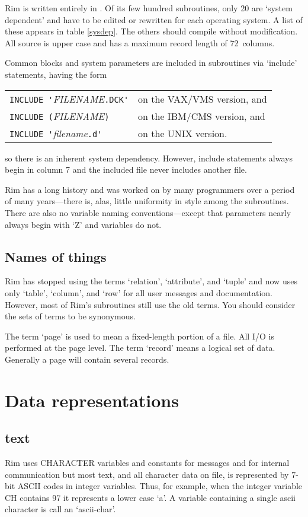 \documentclass[11pt,a4paper]{report}
\begin{document}
Rim is written entirely in \FortranF.  Of its few
hundred subroutines, only 20 are `system dependent'
and have to be edited or rewritten for each operating system.
A list of these appears in table \ref{sysdep}.
The others should compile without modification.
All source is upper case and has a maximum record length of
72~columns.
 
Common blocks and system parameters are included in subroutines
via `include' statements, having the form

\begin{tabular}{ll}
  \verb|INCLUDE '|\emph{FILENAME}\verb|.DCK'| & on the VAX/VMS version, and\\
  \verb|INCLUDE (|\emph{FILENAME}\verb|)| & on the IBM/CMS version, and\\
  \verb|INCLUDE '|\emph{filename}\verb|.d'| & on the UNIX version.
\end{tabular}

so there is an inherent system dependency.  However, include
statements always begin in column 7 and the included file
never includes another file.
 
Rim has a long history and was worked on by many programmers
over a period of many years---there is, alas, little
uniformity in style among the subroutines.  There are also
no variable naming conventions---except that parameters
nearly always begin with `Z' and variables do not.
 
\subsection{Names of things}
%
Rim has stopped using the terms `relation', `attribute', and `tuple'
and now uses only `table', `column', and `row' for all user
messages and documentation.  However, most of Rim's subroutines
still use the old terms.  You should consider the sets of
terms to be synonymous.
 
The term `page' is used to mean a fixed-length portion of a file.
All I/O is performed at the page level.  The term `record' means
a logical set of data.  Generally a page will contain several
records.
 
 
\section{Data representations}
%
\subsection{text}
%
Rim uses CHARACTER variables and constants for messages and
for internal communication but most text, and all
character data on file, is represented by 7-bit ASCII codes
in integer variables.  Thus, for example, when the integer
variable CH contains 97 it represents a lower case `a'.
A variable containing a single ascii character is
call an `ascii-char'.
 
\end{document}
